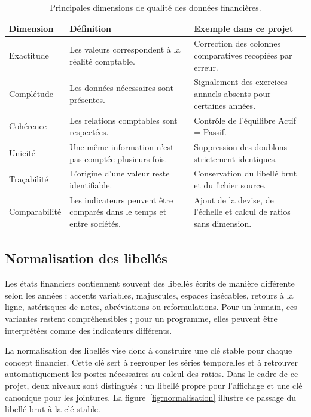 \begin{table}[H]
\centering
\caption[Dimensions de qualité des données]{Principales dimensions de qualité des données financières.}
\label{tab:qualite}
\begin{tabularx}{\linewidth}{|p{3.2cm}|X|X|}
\hline
\textbf{Dimension} & \textbf{Définition} & \textbf{Exemple dans ce projet} \\ \hline
Exactitude & Les valeurs correspondent à la réalité comptable. & Correction des colonnes comparatives recopiées par erreur. \\ \hline
Complétude & Les données nécessaires sont présentes. & Signalement des exercices annuels absents pour certaines années. \\ \hline
Cohérence & Les relations comptables sont respectées. & Contrôle de l'équilibre Actif = Passif. \\ \hline
Unicité & Une même information n'est pas comptée plusieurs fois. & Suppression des doublons strictement identiques. \\ \hline
Traçabilité & L'origine d'une valeur reste identifiable. & Conservation du libellé brut et du fichier source. \\ \hline
Comparabilité & Les indicateurs peuvent être comparés dans le temps et entre sociétés. & Ajout de la devise, de l'échelle et calcul de ratios sans dimension. \\ \hline
\end{tabularx}
\end{table}

\subsection{Normalisation des libellés}
\par Les états financiers contiennent souvent des libellés écrits de manière
différente selon les années : accents variables, majuscules, espaces
insécables, retours à la ligne, astérisques de notes, abréviations ou
reformulations. Pour un humain, ces variantes restent compréhensibles ; pour un
programme, elles peuvent être interprétées comme des indicateurs différents.

\par La normalisation des libellés vise donc à construire une clé stable pour
chaque concept financier. Cette clé sert à regrouper les séries temporelles et à
retrouver automatiquement les postes nécessaires au calcul des ratios. Dans le
cadre de ce projet, deux niveaux sont distingués : un libellé propre pour
l'affichage et une clé canonique pour les jointures. La
figure~\ref{fig:normalisation} illustre ce passage du libellé brut à la clé
stable.


